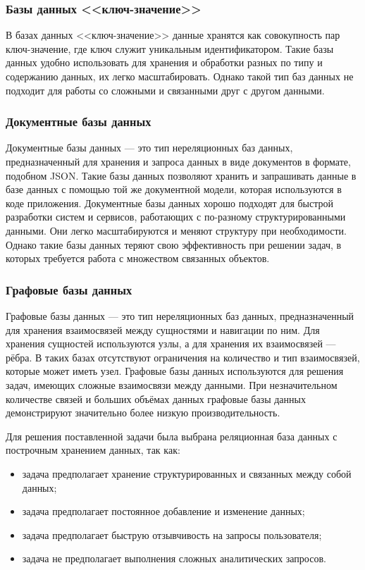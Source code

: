 \subsubsection{Базы данных <<ключ-значение>>}

В базах данных <<ключ-значение>> данные хранятся как совокупность пар ключ-значение, где ключ служит уникальным идентификатором. Такие базы данных удобно использовать для хранения и обработки разных по типу и содержанию данных, их легко масштабировать. Однако такой тип баз данных не подходит для работы со сложными и связанными друг с другом данными.

\subsubsection{Документные базы данных}

Документные базы данных --- это тип нереляционных баз данных, предназначенный для хранения и запроса данных в виде документов в формате, подобном JSON. Такие базы данных позволяют хранить и запрашивать данные в базе данных с помощью той же документной модели, которая используются в коде приложения. Документные базы данных хорошо подходят для быстрой разработки систем и сервисов, работающих с по-разному структурированными данными. Они легко масштабируются и меняют структуру при необходимости. Однако такие базы данных теряют свою эффективность при решении задач, в которых требуется работа с множеством связанных объектов.

\subsubsection{Графовые базы данных}

Графовые базы данных --- это тип нереляционных баз данных, предназначенный для хранения взаимосвязей между сущностями и навигации по ним. Для хранения сущностей используются узлы, а для хранения их взаимосвязей --- рёбра. В таких базах отсутствуют ограничения на количество и тип взаимосвязей, которые может иметь узел. Графовые базы данных используются для решения задач, имеющих сложные взаимосвязи между данными. При незначительном количестве связей и больших объёмах данных графовые базы данных демонстрируют значительно более низкую производительность.

Для решения поставленной задачи была выбрана реляционная база данных с построчным хранением данных, так как:

\begin{itemize}
    \item задача предполагает хранение структурированных и связанных между собой данных;
    \item задача предполагает постоянное добавление и изменение данных;
    \item задача предполагает быструю отзывчивость на запросы пользователя;
    \item задача не предполагает выполнения сложных аналитических запросов.
\end{itemize}

